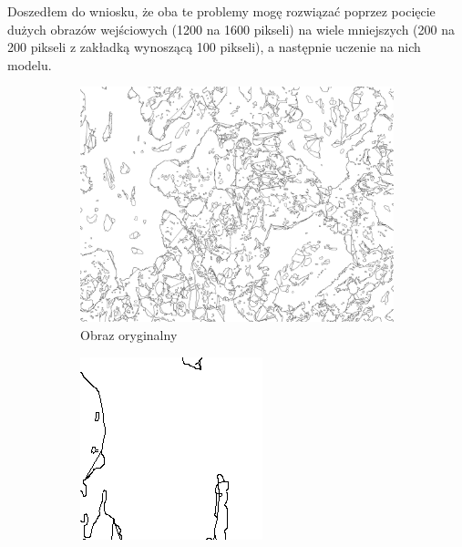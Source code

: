 \documentclass{article}
\begin{document}
Doszedłem do wniosku, że oba te problemy mogę rozwiązać poprzez pocięcie dużych obrazów wejściowych (1200 na 1600 pikseli) na wiele mniejszych (200 na 200 pikseli z zakładką wynoszącą 100 pikseli), a następnie uczenie na nich modelu.
\begin{figure}[H]
    \centering
    \begin{subfigure}{0.8\linewidth}
        \includegraphics[width=\linewidth]{images/edges0.jpg}
        \caption{Obraz oryginalny}
    \end{subfigure}
    \begin{subfigure}{0.4\linewidth}
        \includegraphics[width=\linewidth]{images/edges0_0_0.png}

\end{subfigure}
\end{figure}
\end{document}
